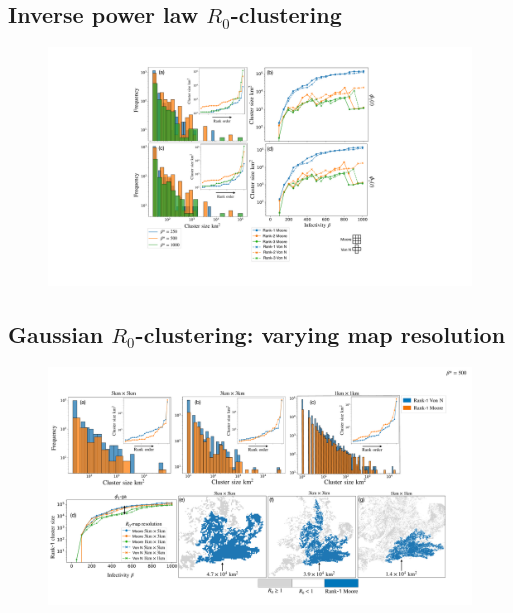 \subsection{Inverse power law $R_0$-clustering}


\begin{figure}
    \centering
    \includegraphics[scale=0.45]{chapter6/figures/fig6-pl-cluster-distribution.pdf}
    \caption{\blindtext}
    \label{fig:my_label}
\end{figure}


\blindtext

\blindtext

\blindtext

\blindtext

\newpage

\subsection{Gaussian $R_0$-clustering: varying map resolution}

\blindtext

\blindtext

\blindtext

\begin{landscape}
\begin{figure}
    \centering
    \includegraphics[scale=0.38]{chapter6/figures/fig6-ga-cluster-distribution.pdf}
    \caption{\blindtext}
    \label{fig:my_label}
\end{figure}
\end{landscape}








